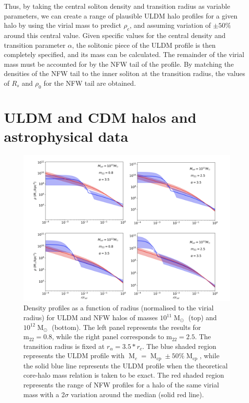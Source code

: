 \documentclass{pasa}%
\begin{document}
Thus, by taking the central soliton density and transition radius as variable parameters, we can create a range of plausible ULDM halo profiles for a given halo by using the virial mass to predict $\rho_c$, and assuming variation of $\pm 50\% $ around this central value. Given specific values for the central density and transition parameter $\alpha$, the solitonic piece of the ULDM profile is then completely specified, and its mass can be calculated. The remainder of the virial mass must be accounted for by the NFW tail of the profile. By matching the densities of the NFW tail to the inner soliton at the transition radius, the values of $R_s$ and $\rho_0$ for the NFW tail are obtained.  



\section{ULDM and CDM halos and astrophysical data}\label{sec:velocity}

\begin{figure}[t]
\centering
\includegraphics[scale=0.4, trim={2cm 0cm 0cm 1cm}]{new_combined_1.png}
\caption{Density profiles as a function of radius (normalised to the virial radius) for ULDM and NFW halos of masses $10^{11}\operatorname{M}_{\odot}$ (top) and $10^{12}\operatorname{M}_{\odot}$ (bottom). The left panel represents the results for $\mathrm{m_{22}} = 0.8$, while the right panel corresponds to $\mathrm{m_{22}}=2.5$. The transition radius is fixed at $r_{\alpha} = 3.5*r_c$. The blue shaded region represents the ULDM profile with $\operatorname{M}_c = \operatorname{M}_{\mathrm{cp}} \pm 50 \% \operatorname{M}_{\mathrm{cp}}$, while the solid blue line represents the ULDM profile when the theoretical core-halo mass relation is taken to be exact. The red shaded region represents the range of NFW profiles for a halo of the same virial mass with a 2$\sigma$ variation around the median (solid red line).}\label{fig:profiles}
\end{figure}
 
\end{document}
